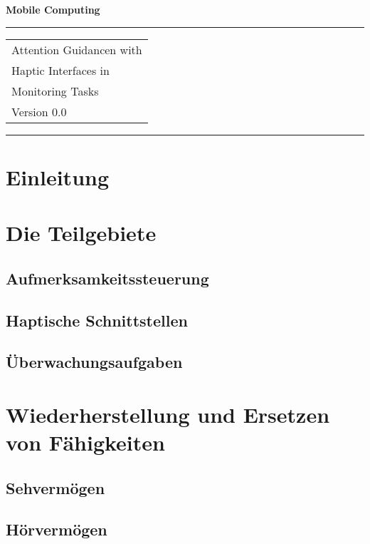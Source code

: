\documentclass{llncs}
\begin{document}
\thispagestyle{empty}

\begin{flushleft}
\LARGE\bfseries Mobile Computing\\
\end{flushleft}

\rule{\textwidth}{1pt}
\vspace{2pt}

\begin{flushright}
\Huge
\begin{tabular}{@{}l}
Attention Guidancen with\\
Haptic Interfaces in\\
Monitoring Tasks\\
{\Large Version 0.0}
\end{tabular}
\end{flushright}

\rule{\textwidth}{1pt}
\vfill

\newpage
\tableofcontents
\newpage

\newpage
\section{Einleitung}
\section{Die Teilgebiete}
\subsection{Aufmerksamkeitssteuerung}
\subsection{Haptische Schnittstellen}
\subsection{Überwachungsaufgaben}

\section{Wiederherstellung und Ersetzen von Fähigkeiten}
\subsection{Sehvermögen}
\subsection{Hörvermögen}
\end{document}
